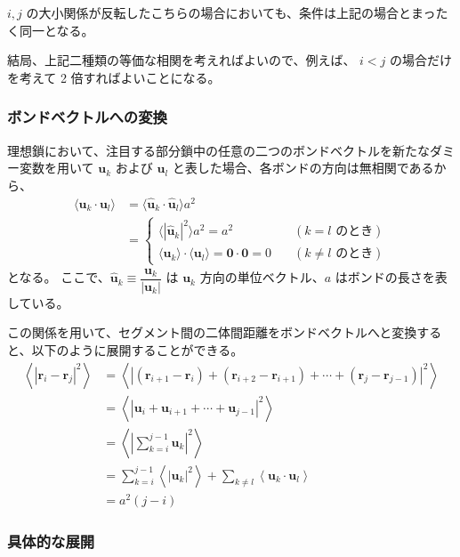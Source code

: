 \documentclass[11pt]{jsarticle}
\begin{document}
\begin{appendix}
\begin{itemize}
$i,j$ の大小関係が反転したこちらの場合においても、条件は上記の場合とまったく同一となる。
\end{itemize}

結局、上記二種類の等価な相関を考えればよいので、例えば、 $i < j$ の場合だけを考えて 2 倍すればよいことになる。

\subsubsection{ボンドベクトルへの変換}

理想鎖において、注目する部分鎖中の任意の二つのボンドベクトルを新たなダミー変数を用いて $\bm{u}_k$ および $\bm{u}_l$ と表した場合、各ボンドの方向は無相関であるから、
\begin{align*}
\langle \bm{u}_k \cdot \bm{u}_l \rangle 
	&= \langle \bm{\hat{u}}_k \cdot \bm{\hat{u}}_l \rangle a^2 \\
	&=
\begin{cases}
\langle |\bm{\hat{u}}_k |^2 \rangle a^2 = a^2	&\quad (\text{$k = l$ のとき}) \\
\langle \bm{u}_k \rangle \cdot \langle \bm{u}_l \rangle = \bm{0}\cdot\bm{0} = 0	&\quad(\text{$k \neq l$ のとき})
\end{cases}
\end{align*}
となる。
ここで、$\bm{\hat{u}}_k \equiv \dfrac{\bm{u}_k}{|\bm{u}_k|}$ は $\bm{u}_k$ 方向の単位ベクトル、$a$ はボンドの長さを表している。

この関係を用いて、セグメント間の二体間距離をボンドベクトルへと変換すると、以下のように展開することができる。
\begin{align*}
\left \langle \left | \bm{r}_i - \bm{r}_j \right |^2 \right \rangle
	&= \left \langle \left | (\bm{r}_{i+1} - \bm{r}_i) + (\bm{r}_{i+2} - \bm{r}_{i+1}) + \cdots + (\bm{r}_j - \bm{r}_{j-1}) \right |^2 \right \rangle \\
	&= \left \langle \left | \bm{u}_i + \bm{u}_{i+1} + \cdots + \bm{u}_{j-1} \right |^2 \right \rangle \\
	&= \left \langle \left| \sum_{k=i}^{j-1} \bm{u}_{k} \right|^2 \right\rangle \\
	&= \sum_{k=i}^{j-1} \left \langle \left| \bm{u}_{k} \right|^2 \right\rangle + \sum_{k \neq l} \left \langle \bm{u}_{k} \cdot \bm{u}_{l} \right\rangle \\
	&= a^2(j-i)
\end{align*}


\subsubsection{具体的な展開}



\end{appendix}
\end{document}
